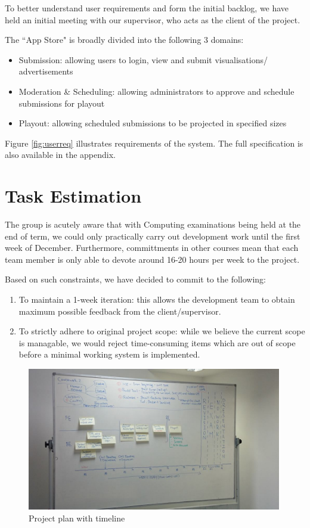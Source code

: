 \documentclass[a4paper]{article}
\begin{document}
To better understand user requirements and form the initial backlog, we have
held an initial meeting with our supervisor, who acts as the client of the 
project.

The ``App Store" is broadly divided into the following 3 domains:
\begin{itemize}
  \item Submission: allowing users to login, view and submit 
        visualisations/ advertisements
  \item Moderation \& Scheduling: allowing administrators to approve
        and schedule submissions for playout
  \item Playout: allowing scheduled submissions to be projected in
        specified sizes

\end{itemize}



Figure \ref{fig:userreq} illustrates requirements of the system.
The full specification is also available in the appendix.

\section{Task Estimation}
The group is acutely aware that with Computing examinations being held at the
end of term, we could only practically carry out development work until the
first week of December. Furthermore, committments in other courses mean that 
each team member is only able to devote around 16-20 hours per week to
the project.

Based on such constraints, we have decided to commit to the following:
\begin{enumerate}
  \item To maintain a 1-week iteration: this allows the development team to
        obtain maximum possible feedback from the client/supervisor.
  \item To strictly adhere to original project scope: while we believe the
        current scope is managable, we would reject time-consuming items which
        are out of scope before a minimal working system is implemented.
\end{enumerate}


\begin{figure}[h]
  \centering
    \includegraphics[width = 0.99\textwidth]{./planning/timeline.jpg}
   
  \caption{Project plan with timeline}
  \label{fig:timeline}
\end{figure}
\end{document}
